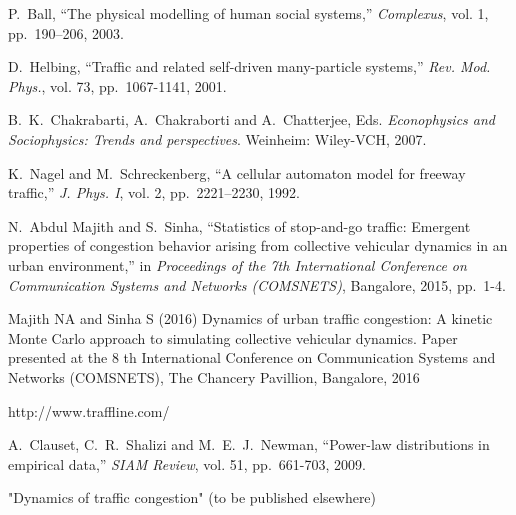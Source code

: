 \documentclass[conference]{IEEEtran}
\begin{document}
\begin{thebibliography}{1}
{P.~Ball, ``The physical modelling of human social systems,'' {\em
Complexus}, vol. 1, pp.~190–206, 2003.}

{D.~Helbing, ``Traffic and related self-driven many-particle
systems,'' {\em Rev. Mod. Phys.}, vol. 73, pp.~1067-1141, 2001.}

{B.~K.~Chakrabarti, A.~Chakraborti and A.~Chatterjee, Eds. {\em
Econophysics and Sociophysics: Trends and perspectives}. 
Weinheim: Wiley-VCH, 2007.}

{K.~Nagel and M.~Schreckenberg, ``A cellular automaton model
for freeway traffic,'' {\em J. Phys. I}, vol. 2, pp.~2221–2230, 1992.}

{N.~Abdul Majith and S.~Sinha, ``Statistics of stop-and-go traffic: Emergent properties of congestion 
behavior arising from collective vehicular dynamics in an urban environment,'' in {\em Proceedings of the 
7th International Conference on Communication Systems and Networks (COMSNETS)}, Bangalore, 2015, pp.~1-4.}

{Majith NA and Sinha S (2016) Dynamics of urban traffic congestion: A kinetic Monte Carlo
approach to simulating collective vehicular dynamics. Paper presented at the 8 th International
Conference on Communication Systems and Networks (COMSNETS), The Chancery Pavillion, Bangalore, 2016}

http://www.traffline.com/

{A.~Clauset, C.~R.~Shalizi and M.~E.~J.~Newman, ``Power-law distributions 
in empirical data,'' {\em SIAM Review}, vol. 51, pp.~661-703, 2009.}

{"Dynamics of traffic congestion" (to be published elsewhere)}




\end{thebibliography}


\end{document}
